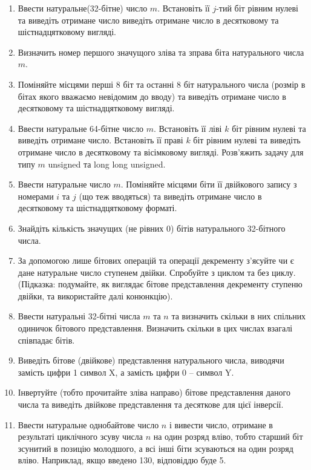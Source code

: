\documentclass[]{article}
\begin{document}
\begin{enumerate}
\item
  Ввести натуральне(32-бітне) число $m$. Встановіть її $j$-тий біт рівним нулеві
  та виведіть отримане число виведіть отримане число в десятковому та
  шістнадцятковому вигляді.
\item
  Визначить номер першого значущого зліва та зправа біта натурального
  числа $m$.
\item
  Поміняйте місцями перші 8 біт та останні 8 біт натурального числа
  (розмір в бітах якого вважаємо невідомим до вводу) та виведіть
  отримане число в десятковому та шістнадцятковому вигляді.
\item
  Ввести натуральне 64-бітне число $m$. Встановіть її ліві $k$ біт рівним
  нулеві та виведіть отримане число. Встановіть її праві $k$ біт рівним
  нулеві та виведіть отримане число в десятковому та вісімковому
  вигляді. Розв'яжить задачу для типу $m$ unsigned та long long unsigned.
\item
  Ввести натуральне число $m$. Поміняйте місцями біти її двійкового запису
  з номерами $i$ та $j$ (що теж вводяться) та виведіть отримане число в
  десятковому та шістнадцятковому форматі.
\item
  Знайдіть кількість значущих (не рівних 0) бітів натурального
  32-бітного числа.
\item
  За допомогою лише бітових операцій та операції декременту з'ясуйте чи є
  дане натуральне число ступенем двійки. Спробуйте з циклом та без
  циклу. (Підказка: подумайте, як виглядає бітове представлення
  декременту ступеню двійки, та використайте далі конюнкцію).
\item
  Ввести натуральні 32-бітні числа $m$ та $n$ та визначить скільки в них
  спільних одиничок бітового представлення. Визначить скільки в цих
  числах взагалі співпадає бітів.
\item
  Виведіть бітове (двійкове) представлення натурального числа, 
виводячи замість цифри 1 символ X, а замість цифри 0 -- символ Y.
\item
  Інвертуйте (тобто прочитайте зліва направо) бітове представлення
  даного числа та виведіть двійкове представлення та десяткове для цієї
  інверсії.
\item
  Ввести натуральне однобайтове число $n$ і вивести число, отримане в
  результаті циклічного зсуву числа $n$ на один розряд вліво, тобто
  старший біт зсунитий в позицію молодшого, а всі інші біти зсуваються
  на один розряд вліво. Наприклад, якщо введено 130, відповіддю буде 5.


\end{enumerate}
\end{document}
